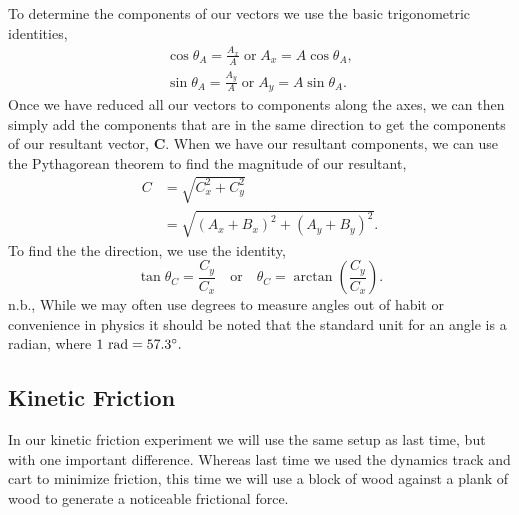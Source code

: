 \documentclass[main.tex]{subfiles}
\begin{document}
To determine the components of our vectors we use the basic trigonometric identities,
\begin{align}
\cos\theta_A=\frac{A_x}{A} \; \text{or} \; A_x=A\cos\theta_A,\\
\sin\theta_A=\frac{A_y}{A} \; \text{or} \; A_y=A\sin\theta_A.
\end{align}
Once we have reduced all our vectors to components along the axes, we can then simply add the components that are in the same direction to get the components of our resultant vector, $\mathbf{C}.$ When we have our resultant components, we can use the Pythagorean theorem to find the magnitude of our resultant,
\begin{align}
C&=\sqrt{C_x^2+C_y^2}\nonumber\\
&=\sqrt{(A_x+B_x)^2+(A_y+B_y)^2}.
\end{align}
To find the the direction, we use the identity,
\begin{equation}
\tan\theta_C=\frac{C_y}{C_x} \quad \text{or} \quad \theta_C=\arctan\left(\frac{C_y}{C_x}\right).
\end{equation}
n.b., While we may often use degrees to measure angles out of habit or convenience in physics it should be noted that the standard unit for an angle is a radian, where $1\text{ rad} = 57.3\degree.$
\FloatBarrier

\subsection*{Kinetic Friction}
In our kinetic friction experiment we will use the same setup as last time, but with one important difference. Whereas last time we used the dynamics track and cart to minimize friction, this time we will use a block of wood against a plank of wood to generate a noticeable frictional force.
\end{document}
